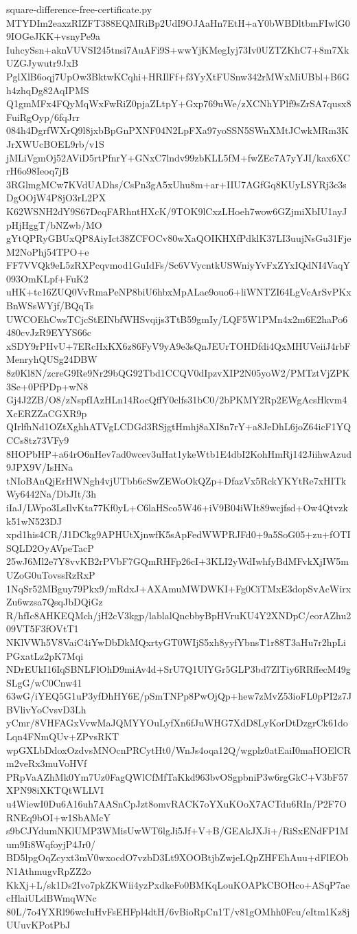 \documentclass[11pt]{article}
\theoremstyle{definition}
\theoremstyle{remark}
\begin{document}
\begin{filecontents*}[overwrite]{square-difference-free-certificate.py}
MTYDIm2eaxzRIZFT388EQMRiBp2UdI9OJAaHn7EtH+aY0bWBDltbmFIwlG09IOGeJKK+vsnyPe9a
IuhcySsn+aknVUVSI245tnsi7AuAFi9S+wwYjKMegIyj73Iv0UZTZKhC7+8m7XkUZGJywutr9JxB
PglXlB6oqj7UpOw3BktwKCqhi+HRIlFf+f3YyXtFUSnw342rMWxMiUBbl+B6Gh4zhqDg82AqIPMS
Q1gmMFx4FQyMqWxFwRiZ0pjaZLtpY+Gxp769uWe/zXCNhYPlf9sZrSA7qusx8FuiRgOyp/6fqJrr
084h4DgrfWXrQ9l8jxbBpGnPXNF04N2LpFXa97yoSSN5SWnXMtJCwkMRm3KJrXWUcBOEL9rb/v1S
jMLiVgmOj52AViD5rtPfnrY+GNxC7lndv99zbKLL5fM+fwZEc7A7yYJI/kax6XCrH6o98Ieoq7jB
3RGlmgMCw7KVdUADhs/CsPn3gA5xUhu8m+ar+IIU7AGfGq8KUyLSYRj3c3sDgOOjW4P8jO3rL2PX
K62WSNH2dY9S67DcqFARhntHXcK/9TOK9lCxzLHoeh7wow6GZjmiXbIU1ayJpHjHggT/bNZwb/MO
gYtQPRyGBUxQP8AiyIct38ZCFOCv80wXaQOIKHXfPdklK37LI3uujNsGu31FjeM2NoPhj54TPO+e
FF7VVQk9eL5zRXPcqvmod1GuIdFs/Sc6VVycntkUSWniyYvFxZYxIQdNI4VaqY093OmKLpf+FuK2
uHK+tc16ZUQ0VvRmaPeNP8biU6hbxMpALae9ouo6+liWNTZI64LgVcArSvPKxBnWSsWYjf/BQqTs
UWCOEhCwsTCjcStEINbfWHSvqijs3TtB59gmIy/LQF5W1PMn4x2m6E2haPo6480cvJzR9EYYS66c
xSDY9rPHvU+7ERcHxKX6z86FyV9yA9e3sQnJEUrTOHDfdi4QxMHUVeiiJ4rbFMenryhQUSg24DBW
8z0Kl8N/zcreG9Re9Nr29bQG92Tbd1CCQV0dIpzvXIP2N05yoW2/PMTztVjZPK3Se+0PfPDp+wN8
Gj4J2ZB/O8/zNspfIAzHLn14RocQffY0clfs31bC0/2bPKMY2Rp2EWgAcsHkvm4XcERZZaCGXR9p
QIrlfhNd1OZtXghhATVgLCDGd3RSjgtHmhj8aXI8n7rY+a8JeDhL6joZ64icF1YQCCs8tz73VFy9
8HOPbHP+a64rO6nHev7ad0wcev3uHat1ykeWtb1E4dbI2KohHmRj142JiihwAzud9JPX9V/IsHNa
tNIoBAnQjErHWNgh4vjUTbb6cSwZEWoOkQZp+DfazVx5RckYKYtRe7xHITkWy6442Na/DbJIt/3h
iIaJ/LWpo3LsIlvKta77Kf0yL+C6laHSco5W46+iV9B04iWIt89wcjfsd+Ow4Qtvzkk51wN523DJ
xpd1his4CR/J1DCkg9APHUtXjnwfK5sApFedWWPRJFd0+9a5SoG05+zu+fOTISQLD2OyAVpeTacP
25wJ6Ml2e7Y8vvKB2rPVbF7GQmRHFp26cI+3KLI2yWdIwhfyBdMFvkXjIW5mUZoG0uTovssRzRxP
1NqSr52MBguy79Pkx9/mRdxJ+AXAmuMWDWKI+Fg0CiTMxE3dopSvAcWirxZu6wzsa7QsqJbDQiGz
R/hfIc8AHKEQMch/jH2cV3kgp/lablalQncbbyBpHVruKU4Y2XNDpC/eorAZhu209VT5F3fOVtT1
NKlVWh5V8VaiC4iYwDbDkMQxrtyGT0WIjS5xh8yyfYbnsT1r88T3aHu7r2hpLiPGxatLz2pK7Mqi
NDrEUkI16IqSBNLFlOhD9miAv4d+SrU7Q1UlYGr5GLP3bd7ZlTiy6RRffecM49gSLgG/wC0Cnw41
63wG/iYEQ5G1uP3yfDhHY6E/pSmTNPp8PwOjQp+hew7zMvZ53ioFL0pPI2z7JBVlivYoCvsvD3Lh
yCmr/8VHFAGxVvwMaJQMYYOuLyfXn6fJuWHG7XdD8LyKorDtDzgrCk61doLqn4FNmQUv+ZPvsRKT
wpGXLbDdoxOzdvsMNOcnPRCytHt0/WnJs4oqa12Q/wgplz0atEaiI0maHOElCRm2veRx3muVoHVf
PRpVaAZhMk0Ym7Uz0FagQWlCfMfTaKkd963bvOSgpbniP3w6rgGkC+V3bF57XPN98iXKTQtWLLVI
u4WiewI0Du6A16uh7AASnCpJzt8omvRACK7oYXuKOoX7ACTdu6RIn/P2F7ORNEq9bOI+w1SbAMcY
s9bCJYdumNKlUMP3WMisUwWT6lgJi5Jf+V+B/GEAkJXJi+/RiSxENdFP1Mum9Ii8WqfoyjP4Jr0/
BD5lpgOqZcyxt3mV0wxocdO7vzbD3Lt9XOOBtjbZwjeLQpZHFEhAuu+dFlEObN1AthmugvRpZZ2o
KkXj+L/sk1Ds2Ivo7pkZKWii4yzPxdkeFo0BMKqLouKOAPkCBOHco+ASqP7aecHlaiULdBWmqWNc
80L/7o4YXRl96wcIuHvFsEHFpl4dtH/6vBioRpCn1T/v81gOMhh0Fcu/eItm1Kz8jUUuvKPotPbJ

\end{filecontents*}
\end{document}
